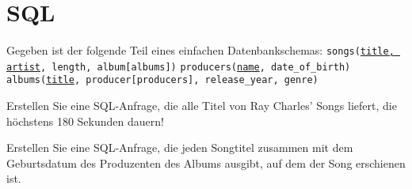 \section{SQL}
\sectionpage

\begin{frame}{Gegeben ist der folgende Teil eines einfachen Datenbankschemas:}
\texttt{songs(\underline{title, artist}, length, album[albums])}
\newline
\texttt{producers(\underline{name}, date\_of\_birth)}
\newline
\texttt{albums(\underline{title}, producer[producers], release\_year, genre)}
\end{frame}

\begin{frame}{Erstellen Sie eine SQL-Anfrage, die alle Titel von Ray Charles' Songs liefert, die höchstens 180 Sekunden dauern!}

\vspace{2em}
\end{frame}

\begin{frame}{Erstellen Sie eine SQL-Anfrage, die jeden Songtitel zusammen mit dem Geburtsdatum des Produzenten des Albums ausgibt, auf dem der Song erschienen ist.}

\vspace{2em}
\end{frame}

